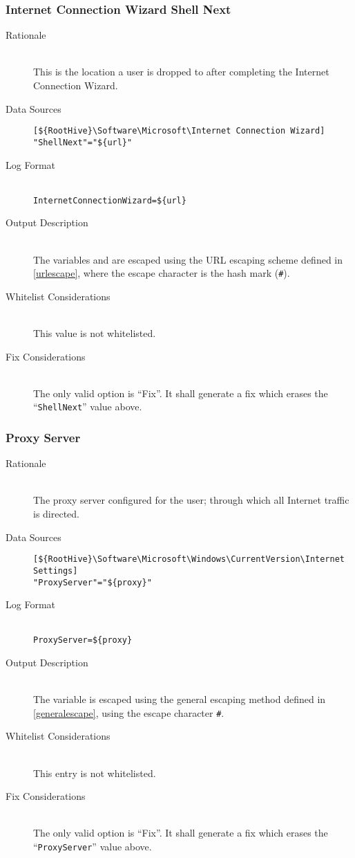 \subsubsection{Internet Connection Wizard Shell Next}
\begin{description}
\item[Rationale] \hfill \\
This is the location a user is dropped to after completing the Internet
Connection Wizard.
\item[Data Sources] \hfill
\vspace{-\baselineskip}
\begin{verbatim}
[${RootHive}\Software\Microsoft\Internet Connection Wizard]
"ShellNext"="${url}"
\end{verbatim}
\item[Log Format] \hfill \\
\verb|InternetConnectionWizard=${url}|
\item[Output Description] \hfill \\
The variables  and  are escaped using the URL escaping
scheme defined in \ref{urlescape}, where the escape character is the hash mark
(\verb|#|).
\item[Whitelist Considerations] \hfill \\
This value is not whitelisted.
\item[Fix Considerations] \hfill \\
The only valid option is ``Fix''. It shall generate a fix which erases the
``\verb|ShellNext|'' value above.
\end{description}

\subsubsection{Proxy Server}
\begin{description}
\item[Rationale] \hfill \\
The proxy server configured for the user; through which all Internet traffic is
directed.
\item[Data Sources] \hfill
\vspace{-\baselineskip}
\begin{verbatim}
[${RootHive}\Software\Microsoft\Windows\CurrentVersion\Internet Settings]
"ProxyServer"="${proxy}"
\end{verbatim}
\item[Log Format] \hfill \\
\verb|ProxyServer=${proxy}|
\item[Output Description] \hfill \\
The variable  is escaped using the general escaping method defined in
\ref{generalescape}, using the escape character \verb|#|.
\item[Whitelist Considerations] \hfill \\
This entry is not whitelisted.
\item[Fix Considerations] \hfill \\
The only valid option is ``Fix''. It shall generate a fix which erases the
``\verb|ProxyServer|'' value above.
\end{description}

